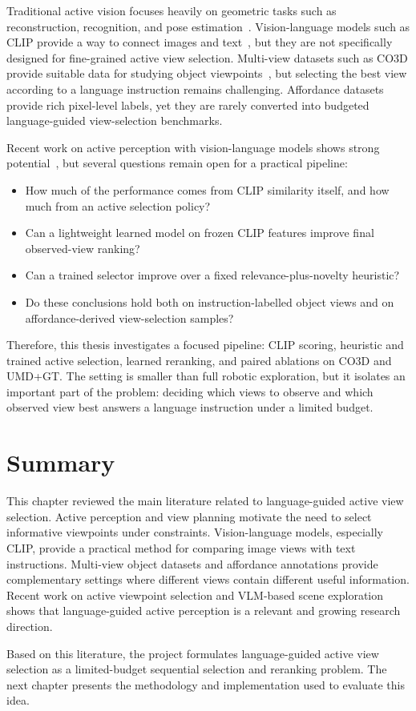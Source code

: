 Traditional active vision focuses heavily on geometric tasks such as reconstruction, recognition, and pose estimation~\cite{zeng_view_2020}. Vision-language models such as CLIP provide a way to connect images and text~\cite{radford_learning_2021}, but they are not specifically designed for fine-grained active view selection. Multi-view datasets such as CO3D provide suitable data for studying object viewpoints~\cite{reizenstein_common_2021}, but selecting the best view according to a language instruction remains challenging. Affordance datasets provide rich pixel-level labels, yet they are rarely converted into budgeted language-guided view-selection benchmarks.

Recent work on active perception with vision-language models shows strong potential~\cite{sripada_scene_2025,wang_actiview_2025}, but several questions remain open for a practical pipeline:

\begin{itemize}
    \item How much of the performance comes from CLIP similarity itself, and how much from an active selection policy?
    \item Can a lightweight learned model on frozen CLIP features improve final observed-view ranking?
    \item Can a trained selector improve over a fixed relevance-plus-novelty heuristic?
    \item Do these conclusions hold both on instruction-labelled object views and on affordance-derived view-selection samples?
\end{itemize}

Therefore, this thesis investigates a focused pipeline: CLIP scoring, heuristic and trained active selection, learned reranking, and paired ablations on CO3D and UMD+GT. The setting is smaller than full robotic exploration, but it isolates an important part of the problem: deciding which views to observe and which observed view best answers a language instruction under a limited budget.

\section{Summary}

This chapter reviewed the main literature related to language-guided active view selection. Active perception and view planning motivate the need to select informative viewpoints under constraints. Vision-language models, especially CLIP, provide a practical method for comparing image views with text instructions. Multi-view object datasets and affordance annotations provide complementary settings where different views contain different useful information. Recent work on active viewpoint selection and VLM-based scene exploration shows that language-guided active perception is a relevant and growing research direction.

Based on this literature, the project formulates language-guided active view selection as a limited-budget sequential selection and reranking problem. The next chapter presents the methodology and implementation used to evaluate this idea.

